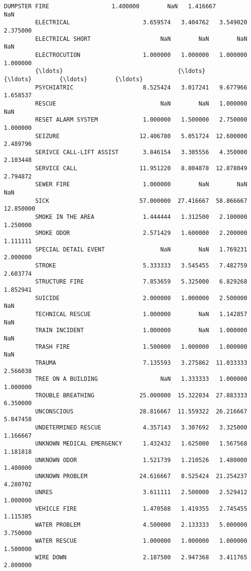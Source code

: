 \documentclass[11pt]{article}
\begin{document}
\begin{Verbatim}[commandchars=\\\{\}]
         DUMPSTER FIRE                  1.400000        NaN   1.416667        NaN   
         ELECTRICAL                     3.659574   3.404762   3.549020   2.375000   
         ELECTRICAL SHORT                    NaN        NaN        NaN        NaN   
         ELECTROCUTION                  1.000000   1.000000   1.000000   1.000000   
         {\ldots}                                 {\ldots}        {\ldots}        {\ldots}        {\ldots}   
         PSYCHIATRIC                    8.525424   3.017241   9.677966   1.658537   
         RESCUE                              NaN        NaN   1.000000        NaN   
         RESET ALARM SYSTEM             1.000000   1.500000   2.750000   1.000000   
         SEIZURE                       12.406780   5.051724  12.600000   2.489796   
         SERIVCE CALL-LIFT ASSIST       3.846154   3.305556   4.350000   2.103448   
         SERVICE CALL                  11.951220   8.804878  12.878049   2.794872   
         SEWER FIRE                     1.000000        NaN        NaN        NaN   
         SICK                          57.000000  27.416667  58.866667  12.850000   
         SMOKE IN THE AREA              1.444444   1.312500   2.100000   1.250000   
         SMOKE ODOR                     2.571429   1.600000   2.200000   1.111111   
         SPECIAL DETAIL EVENT                NaN        NaN   1.769231   2.000000   
         STROKE                         5.333333   3.545455   7.482759   2.603774   
         STRUCTURE FIRE                 7.853659   5.325000   6.829268   1.852941   
         SUICIDE                        2.000000   1.000000   2.500000        NaN   
         TECHNICAL RESCUE               1.000000        NaN   1.142857        NaN   
         TRAIN INCIDENT                 1.000000        NaN   1.000000        NaN   
         TRASH FIRE                     1.500000   1.000000   1.000000        NaN   
         TRAUMA                         7.135593   3.275862  11.033333   2.566038   
         TREE ON A BUILDING                  NaN   1.333333   1.000000   1.000000   
         TROUBLE BREATHING             25.000000  15.322034  27.883333   6.350000   
         UNCONSCIOUS                   28.816667  11.559322  26.216667   5.847458   
         UNDETERMINED RESCUE            4.357143   3.307692   3.325000   1.166667   
         UNKNOWN MEDICAL EMERGENCY      1.432432   1.625000   1.567568   1.181818   
         UNKNOWN ODOR                   1.521739   1.210526   1.480000   1.400000   
         UNKNOWN PROBLEM               24.616667   8.525424  21.254237   4.280702   
         UNRES                          3.611111   2.500000   2.529412   1.000000   
         VEHICLE FIRE                   1.470588   1.419355   2.745455   1.115385   
         WATER PROBLEM                  4.500000   2.133333   5.000000   3.750000   
         WATER RESCUE                   1.000000   1.000000   1.000000   1.500000   
         WIRE DOWN                      2.187500   2.947368   3.411765   2.800000   
         

\end{Verbatim}
\end{document}
